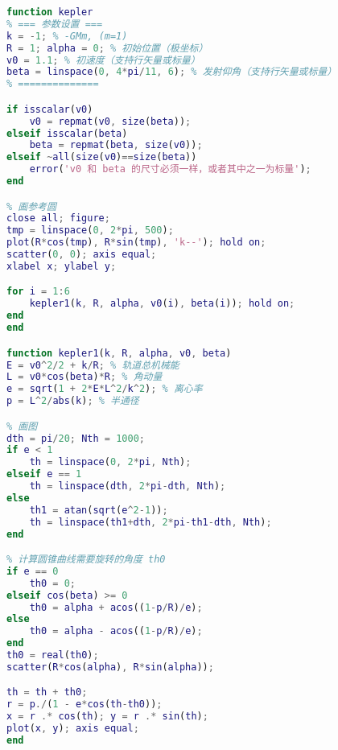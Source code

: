 \begin{lstlisting}[language=matlab]
% 已知初始位置、发射速度、发射方向， 求轨道以及运动方程
function kepler
% === 参数设置 ===
k = -1; % -GMm, (m=1)
R = 1; alpha = 0; % 初始位置（极坐标）
v0 = 1.1; % 初速度（支持行矢量或标量）
beta = linspace(0, 4*pi/11, 6); % 发射仰角（支持行矢量或标量）
% ==============

if isscalar(v0)
    v0 = repmat(v0, size(beta));
elseif isscalar(beta)
    beta = repmat(beta, size(v0));
elseif ~all(size(v0)==size(beta))
    error('v0 和 beta 的尺寸必须一样，或者其中之一为标量');
end

% 画参考圆
close all; figure;
tmp = linspace(0, 2*pi, 500);
plot(R*cos(tmp), R*sin(tmp), 'k--'); hold on;
scatter(0, 0); axis equal;
xlabel x; ylabel y;

for i = 1:6
    kepler1(k, R, alpha, v0(i), beta(i)); hold on;
end
end

function kepler1(k, R, alpha, v0, beta)
E = v0^2/2 + k/R; % 轨道总机械能
L = v0*cos(beta)*R; % 角动量
e = sqrt(1 + 2*E*L^2/k^2); % 离心率
p = L^2/abs(k); % 半通径

% 画图
dth = pi/20; Nth = 1000;
if e < 1
    th = linspace(0, 2*pi, Nth);
elseif e == 1
    th = linspace(dth, 2*pi-dth, Nth);
else
    th1 = atan(sqrt(e^2-1));
    th = linspace(th1+dth, 2*pi-th1-dth, Nth);
end

% 计算圆锥曲线需要旋转的角度 th0
if e == 0
    th0 = 0;
elseif cos(beta) >= 0
    th0 = alpha + acos((1-p/R)/e);
else
    th0 = alpha - acos((1-p/R)/e);
end
th0 = real(th0);
scatter(R*cos(alpha), R*sin(alpha));

th = th + th0;
r = p./(1 - e*cos(th-th0));
x = r .* cos(th); y = r .* sin(th);
plot(x, y); axis equal;
end
\end{lstlisting}
